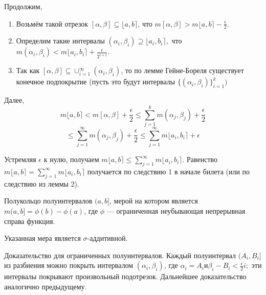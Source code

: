 Продолжим,

\begin{enumerate}

\item Возьмём такой отрезок $[\alpha, \beta] \subseteq \lfloor a, b \rceil$, что $m[\alpha, \beta] > m \lfloor a, b\rceil - \frac{\epsilon}{2}$.

\item Определим такие интервалы $(\alpha_i, \beta_i) \supseteq \lfloor a_i, b_i\rceil,$ что $m(\alpha_i, \beta_i) < m\lfloor a_i, b_i\rceil + \frac{\epsilon}{2^{i+1}}.$

\item Так как $[\alpha, \beta] \subseteq \cup^{\infty}_{i=1} (\alpha_i, \beta_i)$, то по лемме Гейне-Бореля существует конечное подпокрытие (пусть это будут интервалы $\{(\alpha_i, \beta_i)\}^k_{i=1})$
\end{enumerate}

Далее,
$$m\lfloor a, b\rceil < m[\alpha, \beta] + \frac{\epsilon}{2} \leq \sum^k_{j=1} m(\alpha_j, \beta_j) + \frac{\epsilon}{2}$$ 
$$\leq
\sum^{\infty}_{j=1} m(\alpha_j, \beta_j) + \frac{\epsilon}{2} \leq \sum^{\infty}_{j=1} m \lfloor a_i, b_i\rceil + \epsilon$$

Устремляя $\epsilon$ к нулю, получаем $m\lfloor a, b\rceil \leq \sum^{\infty}_{j=1} m\lfloor a_i, b_i\rceil$. Равенство $m\lfloor a, b\rceil = \sum^{\infty}_{j=1} m\lfloor a_i, b_i\rceil$ получается по следствию 1 в начале билета (или по следствию из леммы 2). \EndProof

\leftbar
\Example Полукольцо полуинтервалов $(a, b]$, мерой на котором является $m(a, b] = \phi(b) - \phi(a)$, где $\phi$ — ограниченная неубывающая непрерывная справа функция.

\Th Указанная мера является $\sigma$-аддитивной.

Доказательство для ограниченных полуинтервалов. \Proof Каждый полуинтервал
$(A_i, B_i]$ из разбиения можно покрыть интервалом $(\alpha_i, \beta_i)$, где $\alpha_i = A_i и \beta_i-B_i < \frac{\epsilon}{2} i;$ эти интервалы покрывают произвольный подотрезок. Дальнейшее доказательство аналогично предыдущему. \EndProof
\endleftbar
